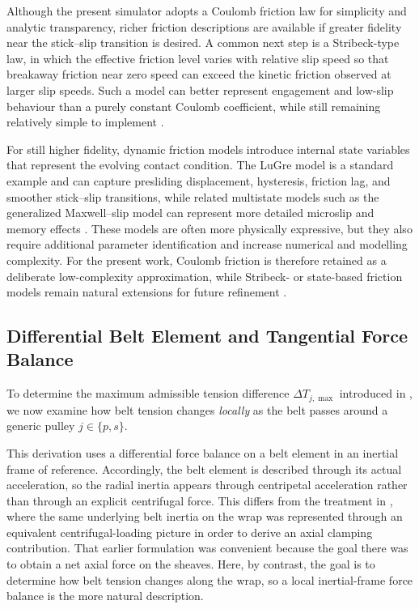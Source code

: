 \documentclass[11pt]{article}
\numberwithin{equation}{section}
\begin{document}
\begin{remarkbox}
Although the present simulator adopts a Coulomb friction law for simplicity and
analytic transparency, richer friction descriptions are available if greater
fidelity near the stick--slip transition is desired. A common next step is a
Stribeck-type law, in which the effective friction level varies with relative
slip speed so that breakaway friction near zero speed can exceed the kinetic
friction observed at larger slip speeds. Such a model can better represent
engagement and low-slip behaviour than a purely constant Coulomb coefficient,
while still remaining relatively simple to implement
\cite{ArmstrongHelouvry1994,CanudasDeWit1995}.

For still higher fidelity, dynamic friction models introduce internal state
variables that represent the evolving contact condition. The LuGre model is a
standard example and can capture presliding displacement, hysteresis, friction
lag, and smoother stick--slip transitions, while related multistate models such
as the generalized Maxwell--slip model can represent more detailed microslip and
memory effects \cite{CanudasDeWit1995,AlBender2005}. These models are often more
physically expressive, but they also require additional parameter identification
and increase numerical and modelling complexity. For the present work, Coulomb
friction is therefore retained as a deliberate low-complexity approximation,
while Stribeck- or state-based friction models remain natural extensions for
future refinement \cite{ArmstrongHelouvry1994}.
\end{remarkbox}

\subsection{Differential Belt Element and Tangential Force Balance}
\label{sec:traction_element}

To determine the maximum admissible tension difference
$\Delta T_{j,\max}$ introduced in ,
we now examine how belt tension changes \emph{locally}
as the belt passes around a generic pulley
$j \in \{p,s\}$.

This derivation uses a differential force balance on a belt element in an
inertial frame of reference.
Accordingly, the belt element is described through its actual acceleration,
so the radial inertia appears through centripetal acceleration rather than
through an explicit centrifugal force.
This differs from the treatment in , where the same
underlying belt inertia on the wrap was represented through an equivalent
centrifugal-loading picture in order to derive an axial clamping contribution.
That earlier formulation was convenient because the goal there was to obtain a
net axial force on the sheaves.
Here, by contrast, the goal is to determine how belt tension changes along the
wrap, so a local inertial-frame force balance is the more natural description.
\end{document}

